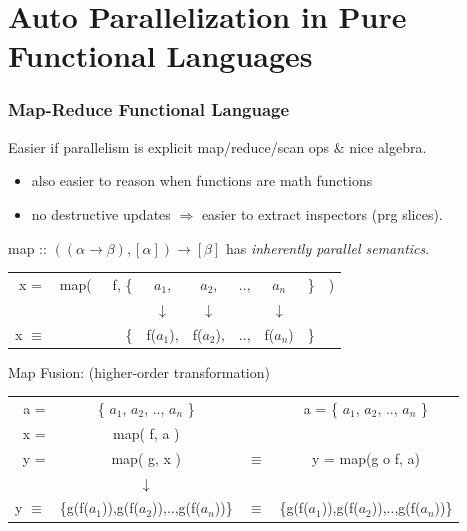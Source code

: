 \documentclass{beamer}
\renewcommand{\emph}[1]{\textcolor{structure}{#1}}
\newcommand{\emp}[1]{\textcolor{DikuRed}{ #1}}
\begin{document}
\section{Auto Parallelization in Pure Functional Languages}

\begin{frame}[fragile]
	\tableofcontents[currentsection]
\end{frame}

\begin{frame}[fragile,t]
   \frametitle{Map-Reduce Functional Language}

\alert{Easier if parallelism is explicit map/reduce/scan ops \& nice algebra.}
\begin{itemize}
    \item also easier to reason when functions are math functions
    \item no destructive updates $\Rightarrow$ easier to extract inspectors (prg slices).
\end{itemize}
\bigskip

\emp{map} :: $((\alpha \rightarrow \beta), [\alpha]) \rightarrow [\beta] $ has \emph{\em inherently parallel semantics}.

\bigskip

\begin{tabular}{crcccccl}
x = & \emp{map}(~~~f, \{& $a_1$, & $a_2$, & .., & $a_n$ & \} & )\\
    &      & $\downarrow$ & $\downarrow$ &  & $\downarrow$ & &\\
x $\equiv$ &  \{  & \emph{f($a_1$)}, & \emph{f($a_2$)}, & .., & \emph{f($a_n$)} & \} &
\end{tabular}

\bigskip
\bigskip
\pause

\emp{Map Fusion:} (higher-order transformation)

\begin{tabular}{rccc}
a = & \{ $a_1$, $a_2$, .., $a_n$ \} & & a = \{ $a_1$, $a_2$, .., $a_n$ \} \\  
\emp{x =} & \emp{map( f, a )} & & \\
\emph{y} = & \emp{map( g, x )} & $\equiv$ & \emph{y} = \emp{map(g o f, a)}\\
  & $\downarrow$ & & \\
\emph{y} $\equiv$ &  \{\emph{g(f($a_1$))},\emph{g(f($a_2$))},..,\emph{g(f($a_n$))}\} & $\equiv$ & \{\emph{g(f($a_1$))},\emph{g(f($a_2$))},..,\emph{g(f($a_n$))}\} \\
\end{tabular}

\end{frame}
\end{document}
